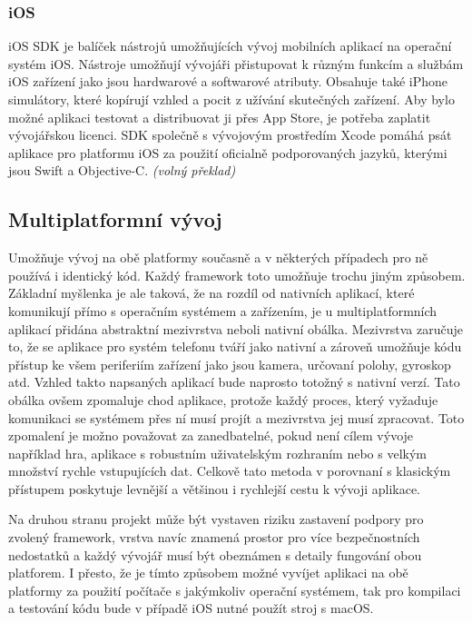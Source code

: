 \documentclass[
  biblatex,
  glossaries,
  index
]{kidiplom}
\begin{document}
\subsubsection{iOS}
iOS SDK je balíček nástrojů umožňujících vývoj mobilních aplikací na operační systém iOS. Nástroje umožňují vývojáři přistupovat k různým funkcím a službám iOS zařízení jako jsou hardwarové a softwarové atributy. Obsahuje také iPhone simulátory, které kopírují vzhled a pocit z užívání skutečných zařízení. Aby bylo možné aplikaci testovat a distribuovat ji přes App Store, je potřeba zaplatit vývojářskou licenci. SDK společně s vývojovým prostředím Xcode pomáhá psát aplikace pro platformu iOS za použití oficialně podporovaných  jazyků, kterými jsou Swift a Objective-C. 
\cite{2}
\textit{(volný překlad)}

\subsection{Multiplatformní vývoj}
Umožňuje vývoj na obě platformy současně a v některých případech pro ně používá i identický kód. Každý framework toto umožňuje trochu jiným způsobem. Základní myšlenka je ale taková, že na rozdíl od nativních aplikací, které komunikují přímo s operačním systémem a zařízením, je u multiplatformních aplikací přidána abstraktní mezivrstva neboli nativní obálka. Mezivrstva zaručuje to, že se aplikace pro systém telefonu tváří jako nativní a zároveň umožňuje kódu přístup ke všem periferiím zařízení jako jsou kamera, určovaní polohy, gyroskop atd. Vzhled takto napsaných aplikací bude naprosto totožný s nativní verzí. Tato obálka ovšem zpomaluje chod aplikace, protože každý proces, který vyžaduje komunikaci se systémem přes ní musí projít a mezivrstva jej musí zpracovat. Toto zpomalení je možno považovat za zanedbatelné, pokud není cílem vývoje například hra, aplikace s robustním uživatelským rozhraním nebo s velkým množství rychle vstupujících dat. Celkově tato metoda v porovnaní s klasickým přístupem poskytuje levnější a většinou i rychlejší cestu k vývoji aplikace. 

Na druhou stranu projekt může být vystaven riziku zastavení podpory pro zvolený framework, vrstva navíc znamená prostor pro více bezpečnostních nedostatků a každý vývojář musí být obeznámen s detaily fungování obou platforem. I přesto, že je tímto způsobem možné vyvíjet aplikaci na obě platformy za použití počítače s jakýmkoliv operační systémem, tak pro kompilaci a testování kódu bude v případě iOS nutné použít stroj s macOS. 
\end{document}
